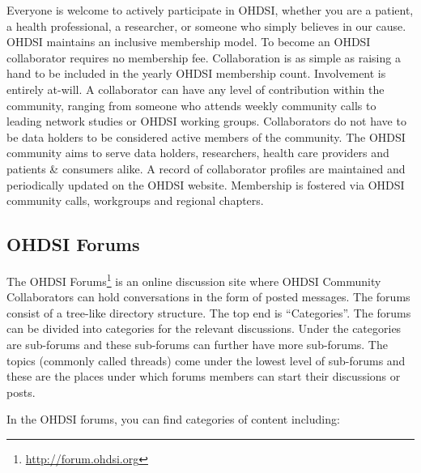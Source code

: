 \documentclass[11pt]{book}
\let\rmarkdownfootnote\footnote%
\def\footnote{\protect\rmarkdownfootnote}
\theoremstyle{definition}
\theoremstyle{definition}
\theoremstyle{definition}
\theoremstyle{remark}
\begin{document}
Everyone is welcome to actively participate in OHDSI, whether you are a patient, a health professional, a researcher, or someone who simply believes in our cause. OHDSI maintains an inclusive membership model. To become an OHDSI collaborator requires no membership fee. Collaboration is as simple as raising a hand to be included in the yearly OHDSI membership count. Involvement is entirely at-will. A collaborator can have any level of contribution within the community, ranging from someone who attends weekly community calls to leading network studies or OHDSI working groups. Collaborators do not have to be data holders to be considered active members of the community. The OHDSI community aims to serve data holders, researchers, health care providers and patients \& consumers alike. A record of collaborator profiles are maintained and periodically updated on the OHDSI website. Membership is fostered via OHDSI community calls, workgroups and regional chapters.  

\hypertarget{ohdsi-forums}{%
\subsection{OHDSI Forums}\label{ohdsi-forums}}

The OHDSI Forums\footnote{\url{http://forum.ohdsi.org}} is an online discussion site where OHDSI Community Collaborators can hold conversations in the form of posted messages. The forums consist of a tree-like directory structure. The top end is ``Categories''. The forums can be divided into categories for the relevant discussions. Under the categories are sub-forums and these sub-forums can further have more sub-forums. The topics (commonly called threads) come under the lowest level of sub-forums and these are the places under which forums members can start their discussions or posts.

In the OHDSI forums, you can find categories of content including:
\end{document}

